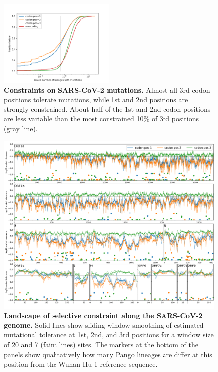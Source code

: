 \documentclass[aps,rmp, twocolumn]{revtex4}
\begin{document}
\begin{figure}
    \includegraphics[width=0.5\textwidth]{figures/fitness_cost.pdf}
    \caption{{\bf Constraints on SARS-CoV-2 mutations.}
    Almost all 3rd codon positions tolerate mutations, while 1st and 2nd positions are strongly constrained.
    About half of the 1st and 2nd codon positions are less variable than the most constrained 10\% of 3rd positions (gray line).
    \label{fig:fitness_costs}}
 \end{figure}

 \begin{figure}[tb]
    \includegraphics[width=\textwidth]{figures/fitness_landscape.pdf}
    \caption{{\bf Landscape of selective constraint along the SARS-CoV-2 genome.}
    Solid lines show sliding window smoothing of estimated mutational tolerance at 1st, 2nd, and 3rd positions for a window size of 20 and 7 (faint lines) sites.
    The markers at the bottom of the panels show qualitatively how many Pango lineages are differ at this position from the Wuhan-Hu-1 reference sequence.
    \label{fig:fitness_landscape}}
 \end{figure}
\end{document}
